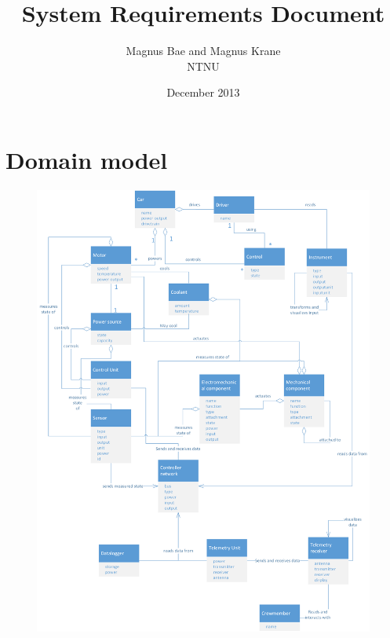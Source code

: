 \documentclass[english,10pt, oneside, a4paper]{article}
\begin{document}
\clearpage
\title{System Requirements Document}
\author{Magnus Bae and Magnus Krane\\ NTNU}
\date{December 2013}

\makeatletter
\renewcommand{\l@section}{\@dottedtocline{1}{1.5em}{2.6em}}
\renewcommand{\l@subsection}{\@dottedtocline{2}{4.0em}{3.6em}}
\renewcommand{\l@subsubsection}{\@dottedtocline{3}{7.4em}{4.5em}}
\makeatother
\renewcommand{\thesection}{D.\arabic{section}}%

\setcounter{tocdepth}{5}
\setcounter{secnumdepth}{5}


\setcounter{page}{55}
\clearpage
\renewcommand\contentsname{Table of Contents}
\tableofcontents






\section{Domain model}
\begin{figure}[!htbp]
  \includegraphics[width=\textwidth]{domain-model.png}
  \label{fig:domain-model}
\end{figure}




\end{document}

